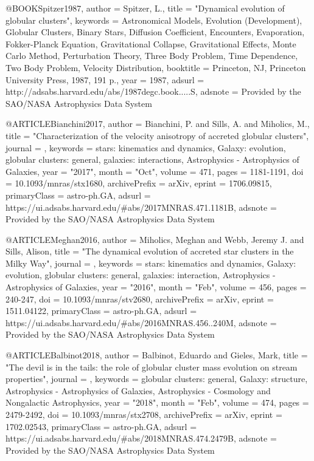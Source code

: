 \documentclass[apj]{emulateapj}
\begin{document}
{{{{{{{{{{{{{@BOOK{Spitzer1987,
   author = {{Spitzer}, L.},
    title = "{Dynamical evolution of globular clusters}",
 keywords = {Astronomical Models, Evolution (Development), Globular Clusters, Binary Stars, Diffusion Coefficient, Encounters, Evaporation, Fokker-Planck Equation, Gravitational Collapse, Gravitational Effects, Monte Carlo Method, Perturbation Theory, Three Body Problem, Time Dependence, Two Body Problem, Velocity Distribution},
booktitle = {Princeton, NJ, Princeton University Press, 1987, 191 p.},
     year = 1987,
   adsurl = {http://adsabs.harvard.edu/abs/1987degc.book.....S},
  adsnote = {Provided by the SAO/NASA Astrophysics Data System}
}


@ARTICLE{Bianchini2017,
       author = {{Bianchini}, P. and {Sills}, A. and {Miholics}, M.},
        title = "{Characterization of the velocity anisotropy of accreted globular clusters}",
      journal = {\mnras},
     keywords = {stars: kinematics and dynamics, Galaxy: evolution, globular clusters: general, galaxies: interactions, Astrophysics - Astrophysics of Galaxies},
         year = "2017",
        month = "Oct",
       volume = {471},
        pages = {1181-1191},
          doi = {10.1093/mnras/stx1680},
archivePrefix = {arXiv},
       eprint = {1706.09815},
 primaryClass = {astro-ph.GA},
       adsurl = {https://ui.adsabs.harvard.edu/\#abs/2017MNRAS.471.1181B},
      adsnote = {Provided by the SAO/NASA Astrophysics Data System}
}


@ARTICLE{Meghan2016,
       author = {{Miholics}, Meghan and {Webb}, Jeremy J. and {Sills}, Alison},
        title = "{The dynamical evolution of accreted star clusters in the Milky Way}",
      journal = {\mnras},
     keywords = {stars: kinematics and dynamics, Galaxy: evolution, globular clusters: general, galaxies: interaction, Astrophysics - Astrophysics of Galaxies},
         year = "2016",
        month = "Feb",
       volume = {456},
        pages = {240-247},
          doi = {10.1093/mnras/stv2680},
archivePrefix = {arXiv},
       eprint = {1511.04122},
 primaryClass = {astro-ph.GA},
       adsurl = {https://ui.adsabs.harvard.edu/\#abs/2016MNRAS.456..240M},
      adsnote = {Provided by the SAO/NASA Astrophysics Data System}
}


@ARTICLE{Balbinot2018,
       author = {{Balbinot}, Eduardo and {Gieles}, Mark},
        title = "{The devil is in the tails: the role of globular cluster mass evolution on stream properties}",
      journal = {\mnras},
     keywords = {globular clusters: general, Galaxy: structure, Astrophysics - Astrophysics of Galaxies, Astrophysics - Cosmology and Nongalactic Astrophysics},
         year = "2018",
        month = "Feb",
       volume = {474},
        pages = {2479-2492},
          doi = {10.1093/mnras/stx2708},
archivePrefix = {arXiv},
       eprint = {1702.02543},
 primaryClass = {astro-ph.GA},
       adsurl = {https://ui.adsabs.harvard.edu/\#abs/2018MNRAS.474.2479B},
      adsnote = {Provided by the SAO/NASA Astrophysics Data System}
}



}}}}}}}}}}}}}
\end{document}
